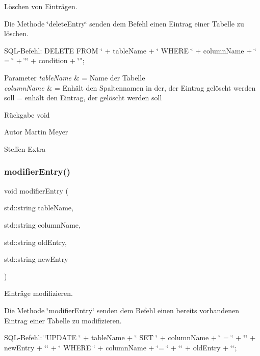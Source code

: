 Löschen von Einträgen. 

Die Methode \char`\"{}delete\+Entry\char`\"{} senden dem Befehl einen Eintrag einer Tabelle zu löschen.~\newline


S\+Q\+L-\/\+Befehl\+: D\+E\+L\+E\+TE F\+R\+OM \char`\"{} + table\+Name + \char`\"{} W\+H\+E\+RE \char`\"{} + column\+Name + \char`\"{} = \char`\"{} + \char`\"{}\textquotesingle{}\char`\"{} + condition + \char`\"{}\textquotesingle{}";


\begin{DoxyParams}{Parameter}
{\em table\+Name} & = Name der Tabelle \\
\hline
{\em column\+Name} & = Enhält den Spaltennamen in der, der Eintrag gelöscht werden soll  = enhält den Eintrag, der gelöscht werden soll\\
\hline
\end{DoxyParams}
\begin{DoxyReturn}{Rückgabe}
void
\end{DoxyReturn}
\begin{DoxyAuthor}{Autor}
Martin Meyer 

Steffen Extra 
\end{DoxyAuthor}
\mbox{\label{entry_8cpp_ab254b5514a4950c7479bc4d513c438dc}} 
\subsubsection{modifier\+Entry()}
{\footnotesize\ttfamily void modifier\+Entry (\begin{DoxyParamCaption}\item[{std\+::string}]{table\+Name,  }\item[{std\+::string}]{column\+Name,  }\item[{std\+::string}]{old\+Entry,  }\item[{std\+::string}]{new\+Entry }\end{DoxyParamCaption})}



Einträge modifizieren. 

Die Methode \char`\"{}modifier\+Entry\char`\"{} senden dem Befehl einen bereits vorhandenen Eintrag einer Tabelle zu modifizieren.~\newline


S\+Q\+L-\/\+Befehl\+: \char`\"{}\+U\+P\+D\+A\+T\+E \char`\"{} + table\+Name + \char`\"{} S\+E\+T \char`\"{} + column\+Name + \char`\"{} = \char`\"{} + \char`\"{}\textquotesingle{}\char`\"{} + new\+Entry + \char`\"{}\textquotesingle{}\char`\"{} + \char`\"{} W\+H\+E\+R\+E \char`\"{} + column\+Name + \char`\"{}= \char`\"{} + \char`\"{}\textquotesingle{}\char`\"{} + old\+Entry + \char`\"{}\textquotesingle{}\char`\"{};


